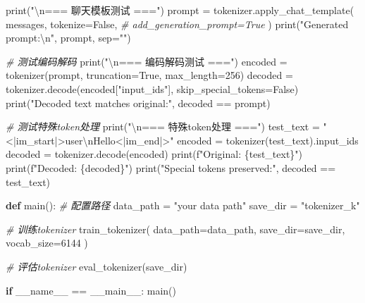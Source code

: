 \documentclass[
]{article}
\newenvironment{Shaded}{}{}
\newcommand{\BuiltInTok}[1]{\textcolor[rgb]{0.00,0.50,0.00}{#1}}
\newcommand{\CharTok}[1]{\textcolor[rgb]{0.25,0.44,0.63}{#1}}
\newcommand{\CommentTok}[1]{\textcolor[rgb]{0.38,0.63,0.69}{\textit{#1}}}
\newcommand{\ControlFlowTok}[1]{\textcolor[rgb]{0.00,0.44,0.13}{\textbf{#1}}}
\newcommand{\DecValTok}[1]{\textcolor[rgb]{0.25,0.63,0.44}{#1}}
\newcommand{\KeywordTok}[1]{\textcolor[rgb]{0.00,0.44,0.13}{\textbf{#1}}}
\newcommand{\NormalTok}[1]{#1}
\newcommand{\OperatorTok}[1]{\textcolor[rgb]{0.40,0.40,0.40}{#1}}
\newcommand{\SpecialCharTok}[1]{\textcolor[rgb]{0.25,0.44,0.63}{#1}}
\newcommand{\SpecialStringTok}[1]{\textcolor[rgb]{0.73,0.40,0.53}{#1}}
\newcommand{\StringTok}[1]{\textcolor[rgb]{0.25,0.44,0.63}{#1}}
\newcommand{\VariableTok}[1]{\textcolor[rgb]{0.10,0.09,0.49}{#1}}
\begin{document}
\begin{Shaded}
\begin{Highlighting}[]
    \BuiltInTok{print}\NormalTok{(}\StringTok{"}\CharTok{\textbackslash{}n}\StringTok{=== 聊天模板测试 ==="}\NormalTok{)}
\NormalTok{    prompt }\OperatorTok{=}\NormalTok{ tokenizer.apply\_chat\_template(}
\NormalTok{        messages, }
\NormalTok{        tokenize}\OperatorTok{=}\VariableTok{False}\NormalTok{, }
        \CommentTok{\# add\_generation\_prompt=True}
\NormalTok{    )}
    \BuiltInTok{print}\NormalTok{(}\StringTok{"Generated prompt:}\CharTok{\textbackslash{}n}\StringTok{"}\NormalTok{, prompt, sep}\OperatorTok{=}\StringTok{""}\NormalTok{)}

    \CommentTok{\# 测试编码解码}
    \BuiltInTok{print}\NormalTok{(}\StringTok{"}\CharTok{\textbackslash{}n}\StringTok{=== 编码解码测试 ==="}\NormalTok{)}
\NormalTok{    encoded }\OperatorTok{=}\NormalTok{ tokenizer(prompt, truncation}\OperatorTok{=}\VariableTok{True}\NormalTok{, max\_length}\OperatorTok{=}\DecValTok{256}\NormalTok{)}
\NormalTok{    decoded }\OperatorTok{=}\NormalTok{ tokenizer.decode(encoded[}\StringTok{"input\_ids"}\NormalTok{], skip\_special\_tokens}\OperatorTok{=}\VariableTok{False}\NormalTok{)}
    \BuiltInTok{print}\NormalTok{(}\StringTok{"Decoded text matches original:"}\NormalTok{, decoded }\OperatorTok{==}\NormalTok{ prompt)}

    \CommentTok{\# 测试特殊token处理}
    \BuiltInTok{print}\NormalTok{(}\StringTok{"}\CharTok{\textbackslash{}n}\StringTok{=== 特殊token处理 ==="}\NormalTok{)}
\NormalTok{    test\_text }\OperatorTok{=} \StringTok{"\textless{}|im\_start|\textgreater{}user}\CharTok{\textbackslash{}n}\StringTok{Hello\textless{}|im\_end|\textgreater{}"}
\NormalTok{    encoded }\OperatorTok{=}\NormalTok{ tokenizer(test\_text).input\_ids}
\NormalTok{    decoded }\OperatorTok{=}\NormalTok{ tokenizer.decode(encoded)}
    \BuiltInTok{print}\NormalTok{(}\SpecialStringTok{f"Original: }\SpecialCharTok{\{}\NormalTok{test\_text}\SpecialCharTok{\}}\SpecialStringTok{"}\NormalTok{)}
    \BuiltInTok{print}\NormalTok{(}\SpecialStringTok{f"Decoded:  }\SpecialCharTok{\{}\NormalTok{decoded}\SpecialCharTok{\}}\SpecialStringTok{"}\NormalTok{)}
    \BuiltInTok{print}\NormalTok{(}\StringTok{"Special tokens preserved:"}\NormalTok{, decoded }\OperatorTok{==}\NormalTok{ test\_text)}

\KeywordTok{def}\NormalTok{ main():}
    \CommentTok{\# 配置路径}
\NormalTok{    data\_path }\OperatorTok{=} \StringTok{"your data path"}
\NormalTok{    save\_dir }\OperatorTok{=} \StringTok{"tokenizer\_k"}

    \CommentTok{\# 训练tokenizer}
\NormalTok{    train\_tokenizer(}
\NormalTok{        data\_path}\OperatorTok{=}\NormalTok{data\_path,}
\NormalTok{        save\_dir}\OperatorTok{=}\NormalTok{save\_dir,}
\NormalTok{        vocab\_size}\OperatorTok{=}\DecValTok{6144}
\NormalTok{    )}

    \CommentTok{\# 评估tokenizer}
\NormalTok{    eval\_tokenizer(save\_dir)}

\ControlFlowTok{if} \VariableTok{\_\_name\_\_} \OperatorTok{==} \StringTok{\textquotesingle{}\_\_main\_\_\textquotesingle{}}\NormalTok{:}
\NormalTok{    main()}
\end{Highlighting}
\end{Shaded}
\end{document}
